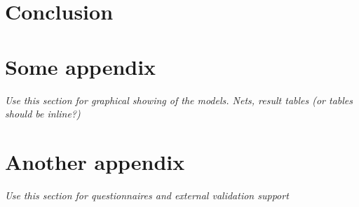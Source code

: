 \documentclass{UoYCSproject}
\begin{document}
\chapter{Conclusion}
\label{cha:conclusion}


\appendix
\chapter{Some appendix}
\textit{Use this section for graphical showing of the models. Nets, result tables (or tables should be inline?)}

\chapter{Another appendix}
\textit{Use this section for questionnaires and external validation support}

\printbibliography
\end{document}
